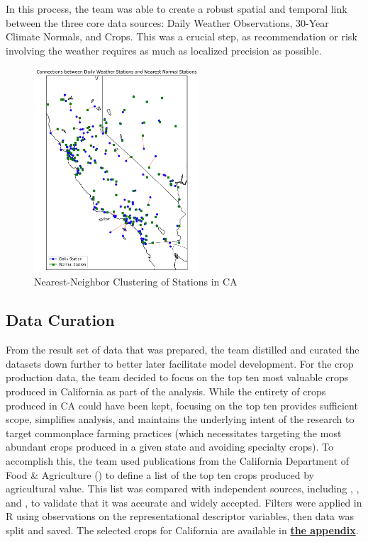 \documentclass{article}
\begin{document}
In this process, the team was able to create a robust spatial and temporal link between the three core data sources: Daily Weather Observations, 30-Year Climate Normals, and Crops. This was a crucial step, as recommendation or risk involving the weather requires as much as localized precision as possible.

\begin{figure}[H]
\vspace*{3mm}
\centering
\includegraphics[width=0.55\textwidth]{Final_Report/images/Nearest_Neighbor_Stations_Mapping_Plot.png}
\vspace*{-5mm}
\caption{Nearest-Neighbor Clustering of Stations in CA}
\label{sec:Nearest Neighbors}
\end{figure}

\subsection{Data Curation}
\hspace{.5cm}From the result set of data that was prepared, the team distilled and curated the datasets down further to better later facilitate model development. For the crop production data, the team decided to focus on the top ten most valuable crops produced in California as part of the analysis. While the entirety of crops produced in CA could have been kept, focusing on the top ten provides sufficient scope, simplifies analysis, and maintains the underlying intent of the research to target commonplace farming practices (which necessitates targeting the most abundant crops produced in a given state and avoiding specialty crops). To accomplish this, the team used publications from the California Department of Food \& Agriculture (\citeyear{CA-Ag}) to define a list of the top ten crops produced by agricultural value. This list was compared with independent sources, including \citep{Stacker}, \citep{FGS}, and \citep{FarmingWork.com}, to validate that it was accurate and widely accepted. Filters were applied in R using observations on the representational descriptor variables, then data was split and saved. The selected crops for California are available in \textbf{\hyperref[sec:choices]{the appendix}}.
\end{document}
